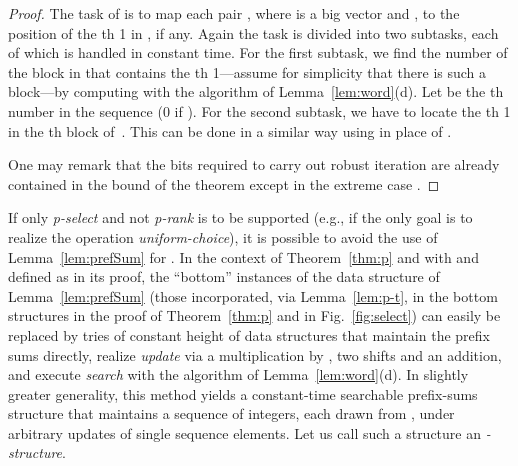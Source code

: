 \documentclass[envcountsame,envcountsect,undated,nolinenumbers]{lnthi}
\def\Tvn#1{\hbox{\textit{#1\/}}}
\begin{document}
\begin{proof}
The task of  is to map each pair ,
where  is a big vector and
, to the position of
the th 1 in , if any.
Again the task is divided into two subtasks,
each of which is handled in constant time. 
For the first subtask, we find the number 
of the block in  that contains the th 1---assume
for simplicity that there is such a block---by
computing
 with the algorithm of
Lemma~\ref{lem:word}(d).
Let  be the th number in the
sequence  (0 if ).
For the second subtask, we have to
locate the th 1 in the th
block of~.
This can be done in a similar way
using  in place of .

One may remark that the  bits required to
carry out robust iteration are already contained in
the bound of the theorem except in the extreme case
.
\end{proof}

If only \Tvn{p-select} and not \Tvn{p-rank} is
to be supported (e.g., if the only goal is to
realize the operation \Tvn{uniform-choice}),
it is possible to avoid the use of Lemma~\ref{lem:prefSum}
for .
In the context of Theorem~\ref{thm:p} and
with  and  defined as in its proof,
the ``bottom'' instances of the data structure of
Lemma~\ref{lem:prefSum}
(those incorporated, via Lemma~\ref{lem:p-t}, in
the bottom structures in the proof of
Theorem~\ref{thm:p} and in Fig.~\ref{fig:select})
can easily be replaced
by tries of constant height
of data structures that maintain the prefix sums
directly, realize \Tvn{update}
via a multiplication by
, two shifts and an addition,
and execute \Tvn{search} with the algorithm
of Lemma~\ref{lem:word}(d).
In slightly greater generality, this method
yields a constant-time searchable prefix-sums structure
that maintains a sequence of  integers,
each drawn from , under
arbitrary updates of single sequence elements.
Let us call such a structure an
\emph{-structure}.
\end{document}
